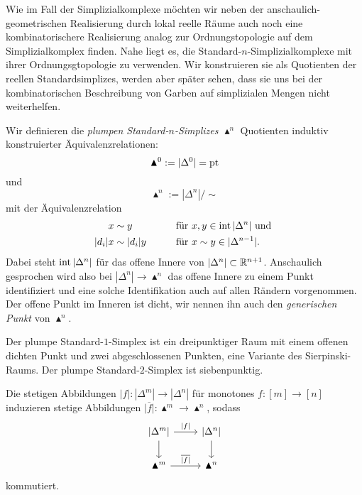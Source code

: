 \begin{bem} \label{clumsy-real}
  Wie im Fall der Simplizialkomplexe möchten wir neben der
  anschaulich-geometrischen Realisierung durch lokal reelle Räume auch
  noch eine kombinatorischere Realisierung analog zur
  Ordnungstopologie auf dem Simplizialkomplex finden. Nahe liegt es,
  die Standard-$n$-Simplizialkomplexe mit ihrer Ordnungsgtopologie zu
  verwenden. Wir konstruieren sie als Quotienten der reellen
  Standardsimplizes, werden aber später sehen, dass sie uns bei der
  kombinatorischen Beschreibung von Garben auf simplizialen Mengen
  nicht weiterhelfen.

  Wir definieren die \emph{plumpen Standard-$n$-Simplizes
    $\blacktriangle^n$} Quotienten induktiv konstruierter
  Äquivalenzrelationen:
  \[ \blacktriangle^0 := |\Delta^0| = \operatorname{pt} \]
  und
  \[ \blacktriangle^n := |\Delta^n| / \sim \]
  mit der Äquivalenzrelation
  \begin{alignat*}{3}
    x &\sim y && \qquad \text{für } x, y \in \operatorname{int} |\Delta^n| \text{ und }  \\
    |d_i| x &\sim |d_i| y && \qquad \text{für } x \sim y \in |\Delta^{n-1}|.
  \end{alignat*}
  Dabei steht $\operatorname{int} |\Delta^n|$ für das offene Innere von $|\Delta^n|
  \subset \mathbb{R}^{n+1}$. Anschaulich gesprochen wird also bei $|\Delta^n|
  \to \blacktriangle^n$ das offene Innere zu einem Punkt identifiziert
  und eine solche Identifikation auch auf allen Rändern
  vorgenommen. Der offene Punkt im Inneren ist dicht, wir nennen ihn
  auch den \emph{generischen Punkt} von $\blacktriangle^n$.
\end{bem}
\begin{bsp}
  Der plumpe Standard-$1$-Simplex ist ein dreipunktiger Raum mit einem
  offenen dichten Punkt und zwei abgeschlossenen Punkten, eine
  Variante des Sierpinski-Raums. Der plumpe Standard-$2$-Simplex ist
  siebenpunktig.
\end{bsp}
\begin{lemma}
  Die stetigen Abbildungen $|f|: |\Delta^m| \to |\Delta^n|$ für
  monotones $f: [m] \to [n]$ induzieren stetige Abbildungen
  $\overline{|f|}: \blacktriangle^m \to \blacktriangle^n$, sodass
  \[ \begin{tikzcd}
    \lvert \Delta^m \rvert \arrow{d} \arrow{r}{|f|}
    & \lvert \Delta^n \rvert \arrow{d} \\
    \blacktriangle^m \arrow{r}{\overline{|f|}}
    & \blacktriangle^n
  \end{tikzcd} \]
  kommutiert.
\end{lemma}
